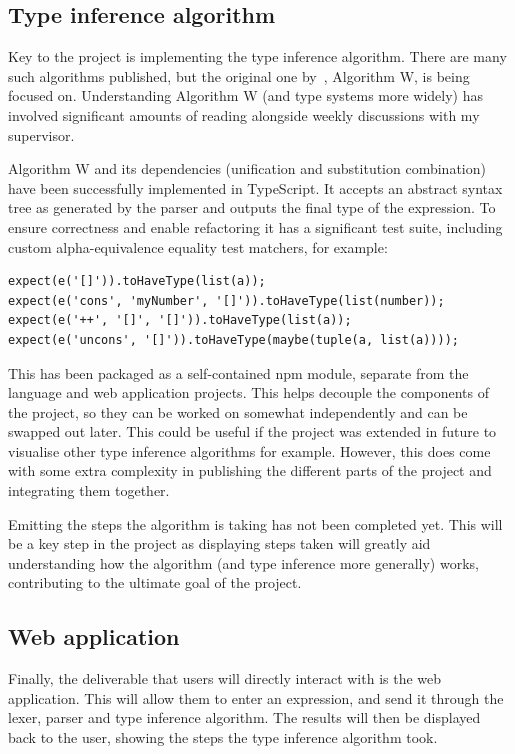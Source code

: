 \documentclass[a4paper,fleqn,12pt]{article}
\begin{document}
\subsection{Type inference algorithm}\label{id:h.el6sta7fzq4a}

Key to the project is implementing the type inference algorithm. There are many such algorithms published, but the original one by~\cite{ref3}, Algorithm W, is being focused on. Understanding Algorithm W (and type systems more widely) has involved significant amounts of reading alongside weekly discussions with my supervisor.

Algorithm W and its dependencies (unification and substitution combination) have been successfully implemented in TypeScript. It accepts an abstract syntax tree as generated by the parser and outputs the final type of the expression. To ensure correctness and enable refactoring it has a significant test suite, including custom alpha-equivalence equality test matchers, for example:

\begin{verbatim}
expect(e('[]')).toHaveType(list(a));
expect(e('cons', 'myNumber', '[]')).toHaveType(list(number));
expect(e('++', '[]', '[]')).toHaveType(list(a));
expect(e('uncons', '[]')).toHaveType(maybe(tuple(a, list(a))));
\end{verbatim}

This has been packaged as a self-contained npm module, separate from the language and web application projects. This helps decouple the components of the project, so they can be worked on somewhat independently and can be swapped out later. This could be useful if the project was extended in future to visualise other type inference algorithms for example. However, this does come with some extra complexity in publishing the different parts of the project and integrating them together.

Emitting the steps the algorithm is taking has not been completed yet. This will be a key step in the project as displaying steps taken will greatly aid understanding how the algorithm (and type inference more generally) works, contributing to the ultimate goal of the project.

\subsection{Web application}\label{id:h.cwlbt58wsbeg}

Finally, the deliverable that users will directly interact with is the web application. This will allow them to enter an expression, and send it through the lexer, parser and type inference algorithm. The results will then be displayed back to the user, showing the steps the type inference algorithm took.
\end{document}
